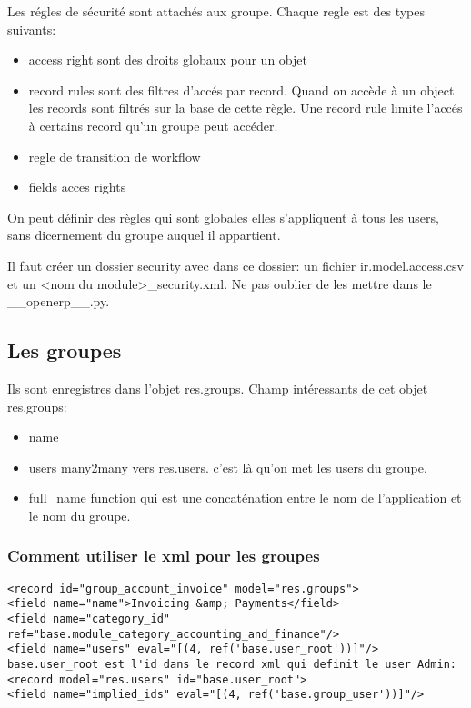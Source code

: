 \documentclass[12pt,a4paper]{article}
\begin{document}
Les régles de sécurité sont attachés aux groupe. Chaque regle est des types suivants:
\begin{itemize}
\item access right sont des droits globaux pour un objet
\item record rules sont des filtres d'accés par record. Quand on accède à un object les records sont filtrés sur la base de cette règle. Une record rule limite l'accés à certains record qu'un groupe peut accéder.
\item regle de transition de workflow
\item fields acces rights
\end{itemize}
On peut définir des règles qui sont globales elles s'appliquent à tous les users, sans dicernement du groupe auquel il appartient. 


Il faut créer un dossier security avec dans ce dossier: un fichier ir.model.access.csv et un <nom du module>\_security.xml. Ne pas oublier de les mettre dans le \_\_openerp\_\_.py.

\subsection{Les groupes}
\label{sec:groups}

Ils sont enregistres dans l'objet res.groups. 
Champ intéressants de cet objet res.groups: 
\begin{itemize}
\item name
\item users many2many vers res.users. c'est là qu'on met les users du groupe. 
\item full\_name function qui est une concaténation entre le nom de l'application et le nom du groupe.
\end{itemize}

\subsubsection{Comment utiliser le xml pour les groupes}
\label{sec:xml_groupe}

\begin{verbatim}
<record id="group_account_invoice" model="res.groups">
<field name="name">Invoicing &amp; Payments</field>
<field name="category_id" ref="base.module_category_accounting_and_finance"/> 
<field name="users" eval="[(4, ref('base.user_root'))]"/> base.user_root est l'id dans le record xml qui definit le user Admin: <record model="res.users" id="base.user_root">
<field name="implied_ids" eval="[(4, ref('base.group_user'))]"/>
\end{verbatim}
\end{document}
